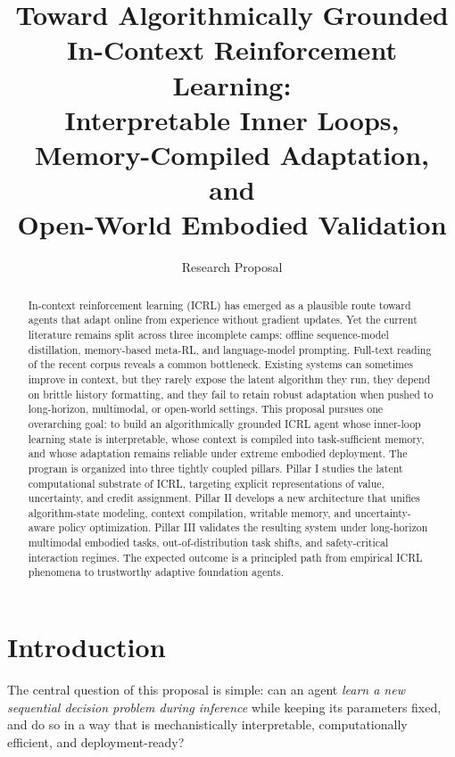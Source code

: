 \documentclass[10pt,twocolumn,letterpaper]{article}
\title{\textbf{Toward Algorithmically Grounded In-Context Reinforcement Learning:\\
Interpretable Inner Loops, Memory-Compiled Adaptation, and\\
Open-World Embodied Validation}}
\author{Research Proposal}
\date{}
\begin{document}
\maketitle

\begin{abstract}
In-context reinforcement learning (ICRL) has emerged as a plausible route toward agents that adapt online from experience without gradient updates. Yet the current literature remains split across three incomplete camps: offline sequence-model distillation, memory-based meta-RL, and language-model prompting. Full-text reading of the recent corpus reveals a common bottleneck. Existing systems can sometimes improve in context, but they rarely expose the latent algorithm they run, they depend on brittle history formatting, and they fail to retain robust adaptation when pushed to long-horizon, multimodal, or open-world settings. This proposal pursues one overarching goal: to build an algorithmically grounded ICRL agent whose inner-loop learning state is interpretable, whose context is compiled into task-sufficient memory, and whose adaptation remains reliable under extreme embodied deployment. The program is organized into three tightly coupled pillars. Pillar I studies the latent computational substrate of ICRL, targeting explicit representations of value, uncertainty, and credit assignment. Pillar II develops a new architecture that unifies algorithm-state modeling, context compilation, writable memory, and uncertainty-aware policy optimization. Pillar III validates the resulting system under long-horizon multimodal embodied tasks, out-of-distribution task shifts, and safety-critical interaction regimes. The expected outcome is a principled path from empirical ICRL phenomena to trustworthy adaptive foundation agents.
\end{abstract}

\section{Introduction}
The central question of this proposal is simple: can an agent \emph{learn a new sequential decision problem during inference} while keeping its parameters fixed, and do so in a way that is mechanistically interpretable, computationally efficient, and deployment-ready?
\end{document}
